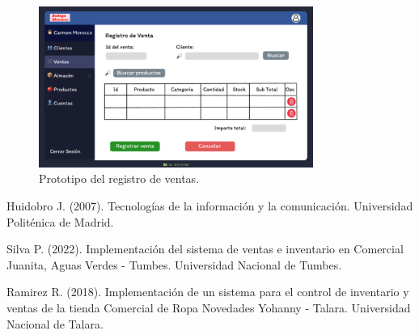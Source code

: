 \documentclass{article}
\begin{document}
\begin{figure}[H]
  \centering
  \includegraphics[width=0.8\textwidth]{./assets/venta.png}
  \caption{Prototipo del registro de ventas.}
\end{figure}

\newpage

\begin{thebibliography}{9}

  Huidobro J. (2007). Tecnologías de la información y la comunicación. Universidad Politénica de Madrid.

  Silva P. (2022). Implementación del sistema de ventas e inventario en Comercial Juanita, Aguas Verdes - Tumbes. Universidad Nacional de Tumbes.

  Ramirez R. (2018). Implementación de un sistema para el control de inventario y ventas de la tienda Comercial de Ropa Novedades Yohanny - Talara. Universidad Nacional de Talara.

\end{thebibliography}
\end{document}
